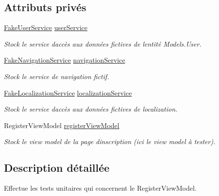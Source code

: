 \subsection*{Attributs privés}
\begin{DoxyCompactItemize}
\item 
\hyperlink{class_boxes_1_1_tests_1_1_mock_1_1_services_1_1_fake_user_service}{Fake\+User\+Service} \hyperlink{class_boxes_1_1_tests_1_1_register_view_model_tests_ab475cc520bf312586e83fd23a22dcf1c}{user\+Service}
\begin{DoxyCompactList}\small\item\em Stock le service d\textquotesingle{}accès aux données fictives de l\textquotesingle{}entité Models.\+User. \end{DoxyCompactList}\item 
\hyperlink{class_boxes_1_1_tests_1_1_mock_1_1_services_1_1_fake_navigation_service}{Fake\+Navigation\+Service} \hyperlink{class_boxes_1_1_tests_1_1_register_view_model_tests_a2a1940ef43106495a7855ee63eda1583}{navigation\+Service}
\begin{DoxyCompactList}\small\item\em Stock le service de navigation fictif. \end{DoxyCompactList}\item 
\hyperlink{class_boxes_1_1_tests_1_1_mock_1_1_services_1_1_fake_localization_service}{Fake\+Localization\+Service} \hyperlink{class_boxes_1_1_tests_1_1_register_view_model_tests_a0dcb3e380c02a5620a2f80a082331694}{localization\+Service}
\begin{DoxyCompactList}\small\item\em Stock le service d\textquotesingle{}accès aux données fictives de localization. \end{DoxyCompactList}\item 
Register\+View\+Model \hyperlink{class_boxes_1_1_tests_1_1_register_view_model_tests_a355429c3d088c1561b422af6cd0d7c98}{register\+View\+Model}
\begin{DoxyCompactList}\small\item\em Stock le view model de la page d\textquotesingle{}inscription (ici le view model à tester). \end{DoxyCompactList}\end{DoxyCompactItemize}


\subsection{Description détaillée}
Effectue les tests unitaires qui concernent le Register\+View\+Model. 



